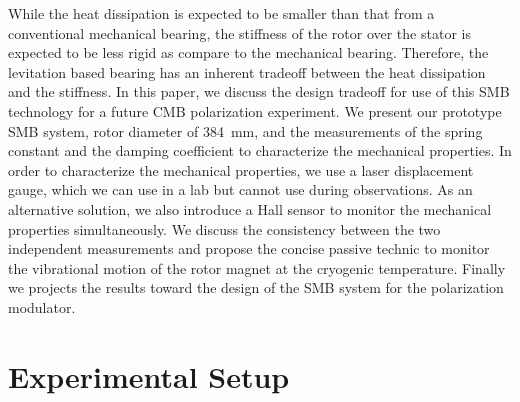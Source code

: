 \documentclass[a4paper]{jpconf}
\newcommand{\cred}[1]{{\color{red}#1}}
\begin{document}
While the heat dissipation is expected to be smaller than that from a conventional mechanical bearing, the stiffness of the rotor over the stator is expected to be less rigid as compare to the mechanical bearing.
Therefore, the levitation based bearing has an inherent tradeoff between the heat dissipation and the stiffness.
In this paper, we discuss the design tradeoff for use of this SMB technology for a future CMB polarization experiment.
We present our prototype SMB system, rotor diameter of 384~mm, and the measurements of the spring constant and the damping coefficient to characterize the mechanical properties.
In order to characterize the mechanical properties, we use a laser displacement gauge, which we can use in a lab but cannot use during observations.
As an alternative solution, we also introduce a Hall sensor to monitor the mechanical properties simultaneously.
We discuss the consistency between the two independent measurements and propose the concise passive technic to monitor the vibrational motion of the rotor magnet at the cryogenic temperature.
Finally we projects the results toward the design of the SMB system for the polarization modulator.


\section*{Experimental Setup}
\end{document}
